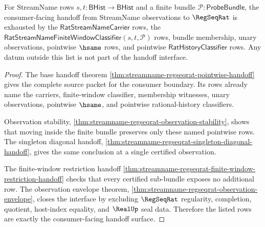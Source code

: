 \begin{theorem}
\label{thm:streamname-regseqrat-pointwise-classifier-handoff-exactness}
For StreamName rows $s,t:\mathsf{BHist}\to\mathsf{BHist}$ and a finite
bundle $\mathcal P:\mathsf{ProbeBundle}$, the consumer-facing handoff from
StreamName observations to $\RegSeqRat$ is exhausted by the
$\mathsf{RatStreamNameCarrier}$ rows, the
$\mathsf{RatStreamNameFiniteWindowClassifier}(s,t,\mathcal P)$ rows, bundle
membership, unary observations, pointwise $\hsame$ rows, and pointwise
$\mathsf{RatHistoryClassifier}$ rows. Any datum outside this list is not part
of the handoff interface.
\end{theorem}
\begin{proof}
The base handoff theorem
\autoref{thm:streamname-regseqrat-pointwise-handoff} gives the complete
source packet for the consumer boundary. Its rows already name the carriers,
finite-window classifier, membership witnesses, unary observations,
pointwise $\hsame$, and pointwise rational-history classifiers.

Observation stability,
\autoref{thm:streamname-regseqrat-observation-stability}, shows that moving
inside the finite bundle preserves only these named pointwise rows. The
singleton diagonal handoff,
\autoref{thm:streamname-regseqrat-singleton-diagonal-handoff}, gives the
same conclusion at a single certified observation.

The finite-window restriction handoff
\autoref{thm:streamname-regseqrat-finite-window-restriction-handoff} checks
that every certified sub-bundle exposes no additional row. The observation
envelope theorem,
\autoref{thm:streamname-regseqrat-observation-envelope}, closes the
interface by excluding $\RegSeqRat$ regularity, completion, quotient,
host-index equality, and $\RealUp$ seal data. Therefore the listed rows are
exactly the consumer-facing handoff surface.
\end{proof}

